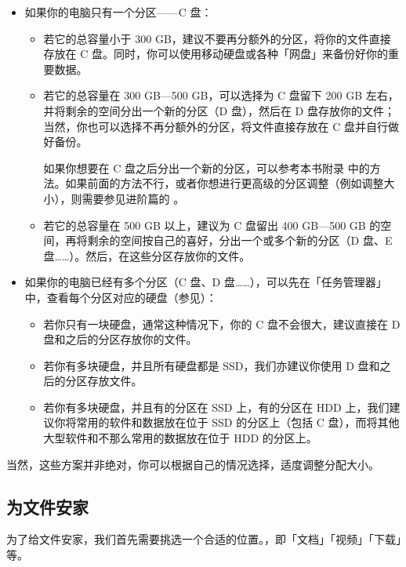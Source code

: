 {{{{\begin{itemize}
  \item 如果你的电脑只有一个分区——C 盘：
  \begin{itemize}
    \item 若它的总容量小于 300 GB，建议不要再分额外的分区，将你的文件直接存放在 C 盘。同时，你可以使用移动硬盘或各种「网盘」来备份好你的重要数据。
    \item 若它的总容量在 300 GB—500 GB，可以选择为 C 盘留下 200 GB 左右，并将剩余的空间分出一个新的分区（D 盘），然后在 D 盘存放你的文件；当然，你也可以选择不再分额外的分区，将文件直接存放在 C 盘并自行做好备份。
      \begin{note}
        如果你想要在 C 盘之后分出一个新的分区，可以参考本书附录 中的方法。如果前面的方法不行，或者你想进行更高级的分区调整（例如调整大小），则需要参见进阶篇的 。
      \end{note}
    \item 若它的总容量在 500 GB 以上，建议为 C 盘留出 400 GB—500 GB 的空间，再将剩余的空间按自己的喜好，分出一个或多个新的分区（D 盘、E 盘……）。然后，在这些分区存放你的文件。
  \end{itemize}
  \item 如果你的电脑已经有多个分区（C 盘、D 盘……），可以先在「任务管理器」中，查看每个分区对应的硬盘（参见）：
  \begin{itemize}
    \item 若你只有一块硬盘，通常这种情况下，你的 C 盘不会很大，建议直接在 D 盘和之后的分区存放你的文件。
    \item 若你有多块硬盘，并且所有硬盘都是 SSD，我们亦建议你使用 D 盘和之后的分区存放文件。
    \item 若你有多块硬盘，并且有的分区在 SSD 上，有的分区在 HDD 上，我们建议你将常用的软件和数据放在位于 SSD 的分区上（包括 C 盘），而将其他大型软件和不那么常用的数据放在位于 HDD 的分区上。
  \end{itemize}
\end{itemize}

当然，这些方案并非绝对，你可以根据自己的情况选择，适度调整分配大小。

\subsection{为文件安家}

为了给文件安家，我们首先需要挑选一个合适的位置。，即「文档」「视频」「下载」等。

}}}}
